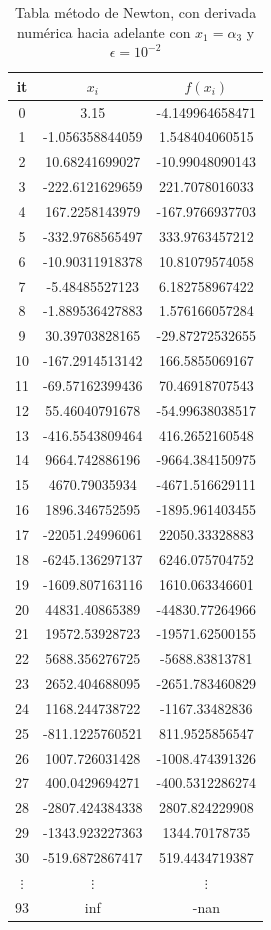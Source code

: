 \documentclass{article} %
\begin{document}
\begin{table}[H]
\centering
\begin{tabular}{|c|c|c|}
\hline
it & $x_i$ & $f(x_i)$\\
\hline
0 & 3.15 & -4.149964658471\\
1 & -1.056358844059 & 1.548404060515\\
2 & 10.68241699027 & -10.99048090143\\
3 & -222.6121629659 & 221.7078016033\\
4 & 167.2258143979 & -167.9766937703\\
5 & -332.9768565497 & 333.9763457212\\
6 & -10.90311918378 & 10.81079574058\\
7 & -5.48485527123 & 6.182758967422\\
8 & -1.889536427883 & 1.576166057284\\
9 & 30.39703828165 & -29.87272532655\\
10 & -167.2914513142 & 166.5855069167\\
11 & -69.57162399436 & 70.46918707543\\
12 & 55.46040791678 & -54.99638038517\\
13 & -416.5543809464 & 416.2652160548\\
14 & 9664.742886196 & -9664.384150975\\
15 & 4670.79035934 & -4671.516629111\\
16 & 1896.346752595 & -1895.961403455\\
17 & -22051.24996061 & 22050.33328883\\
18 & -6245.136297137 & 6246.075704752\\
19 & -1609.807163116 & 1610.063346601\\
20 & 44831.40865389 & -44830.77264966\\
21 & 19572.53928723 & -19571.62500155\\
22 & 5688.356276725 & -5688.83813781\\
23 & 2652.404688095 & -2651.783460829\\
24 & 1168.244738722 & -1167.33482836\\
25 & -811.1225760521 & 811.9525856547\\
26 & 1007.726031428 & -1008.474391326\\
27 & 400.0429694271 & -400.5312286274\\
28 & -2807.424384338 & 2807.824229908\\
29 & -1343.923227363 & 1344.70178735\\
30 & -519.6872867417 & 519.4434719387\\
$\vdots$ & $\vdots$ & $\vdots$\\
93 & inf & -nan\\
\hline
\end{tabular}
\caption{Tabla método de Newton, con derivada numérica hacia adelante con $x_1 = \alpha_3$ y $\epsilon = 10^{-2}$}
\end{table}
\end{document}
